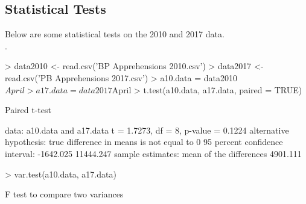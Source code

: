\documentclass{article}
\begin{document}
\subsection{Statistical Tests}
\begin{center}
Below are some statistical tests on the 2010 and 2017 data.\\
.\\

\end{center}
\begin{Schunk}
\begin{Sinput}
> data2010 <- read.csv('BP Apprehensions 2010.csv')
> data2017 <- read.csv('PB Apprehensions 2017.csv')
> a10.data = data2010$April
> a17.data = data2017$April
> t.test(a10.data, a17.data, paired = TRUE)
\end{Sinput}
\begin{Soutput}
	Paired t-test

data:  a10.data and a17.data
t = 1.7273, df = 8, p-value = 0.1224
alternative hypothesis: true difference in means is not equal to 0
95 percent confidence interval:
 -1642.025 11444.247
sample estimates:
mean of the differences 
               4901.111 
\end{Soutput}
\begin{Sinput}
> var.test(a10.data, a17.data)
\end{Sinput}
\begin{Soutput}
	F test to compare two variances


\end{Soutput}
\end{Schunk}
\end{document}
